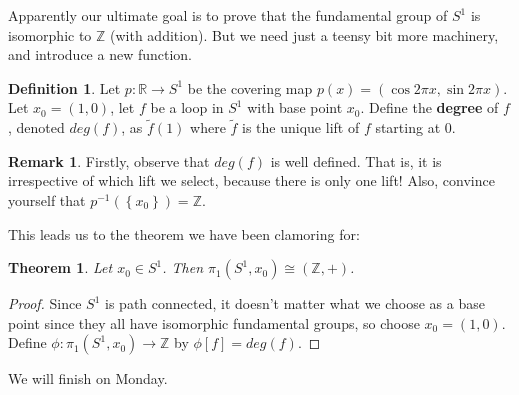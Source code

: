 \documentclass[11pt,reqno]{amsart}
\newtheorem{Theorem}{Theorem}
\theoremstyle{definition}
\newtheorem*{Definition}{Definition}
\newtheorem*{Remark}{Remark}
\begin{document}
    \par
   	Apparently our ultimate goal is to prove that the fundamental group of $S^1$ is isomorphic to $\mathbb{Z}$ (with addition). But we need just a teensy bit more machinery, and introduce a new function.
   	\begin{Definition}
   	Let $p\colon \mathbb{R}\to S^1$ be the covering map $p(x)=(\cos 2\pi x, \sin 2\pi x)$. Let $x_0=(1,0)$, let $f$ be a loop in $S^1$ with base point $x_0$. Define the \textbf{degree} of $f$, denoted $deg(f)$, as $\tilde{f}(1)$ where $\tilde{f}$ is the unique lift of $f$ starting at $0$.
   	\end{Definition}
        
    \begin{Remark}
    Firstly, observe that $deg(f)$ is well defined. That is, it is irrespective of which lift we select, because there is only one lift! Also, convince yourself that $p^{-1}(\left\{x_0\right\})=\mathbb{Z}$.
    \end{Remark}
    
This leads us to the theorem we have been clamoring for:

\begin{Theorem}
Let $x_0\in S^1$. Then $\pi_1(S^1,x_0)\cong (\mathbb{Z},+)$.
\end{Theorem}

\begin{proof}
Since $S^1$ is path connected, it doesn't matter what we choose as a base point since they all have isomorphic fundamental groups, so choose $x_0=(1,0)$. Define $\phi \colon \pi_1(S^1,x_0)\to \mathbb{Z}$ by $\phi[f]=deg(f)$.

\end{proof}

We will finish on Monday.
\end{document}
